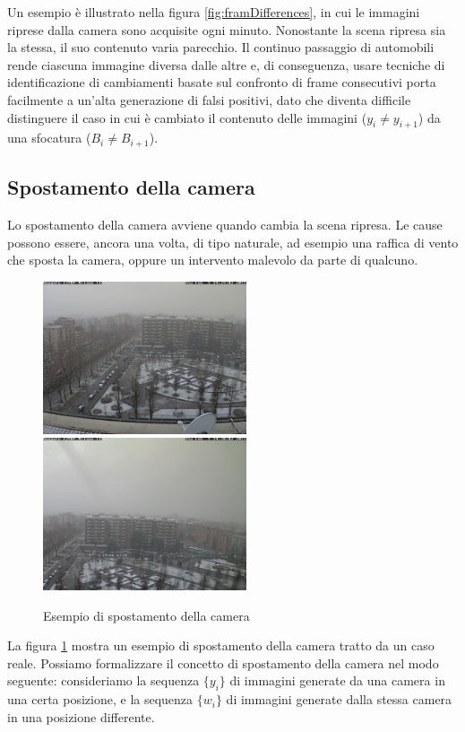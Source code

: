 \noindent Un esempio \`e illustrato nella figura \ref{fig:framDifferences}, in cui le immagini riprese dalla camera sono acquisite ogni minuto. 
Nonostante la scena ripresa sia la stessa, il suo contenuto varia parecchio.
Il continuo passaggio di automobili rende ciascuna immagine diversa dalle altre e, di conseguenza, usare tecniche di identificazione di cambiamenti basate sul confronto di frame consecutivi porta facilmente a un'alta generazione di falsi positivi, dato che diventa difficile distinguere il caso in cui \`e cambiato il contenuto delle immagini ($y_i \neq y_{i + 1}$) da una sfocatura ($B_i \neq B_{i + 1}$).  
\subsection{Spostamento della camera}
Lo spostamento della camera avviene quando cambia la scena ripresa.
Le cause possono essere, ancora una volta, di tipo naturale, ad esempio una raffica di vento che sposta la camera, oppure un intervento malevolo da parte di qualcuno.
\begin{figure}
	\centering
	\includegraphics[width=6cm]{./pictures/testiORIGINALE}
	\includegraphics[width=6cm]{./pictures/testiDISPLACEMENT}
	\caption{Esempio di spostamento della camera}
	\label{fig:testiDISPLACEMENT}
\end{figure}
\noindent La figura \ref{fig:testiDISPLACEMENT} mostra un esempio di spostamento della camera tratto da un caso reale.
Possiamo formalizzare il concetto di spostamento della camera nel modo seguente: consideriamo la sequenza $\{y_i\}$ di immagini generate da una camera in una certa posizione, e la sequenza $\{w_i\}$ di immagini generate dalla stessa camera in una posizione differente.\\
